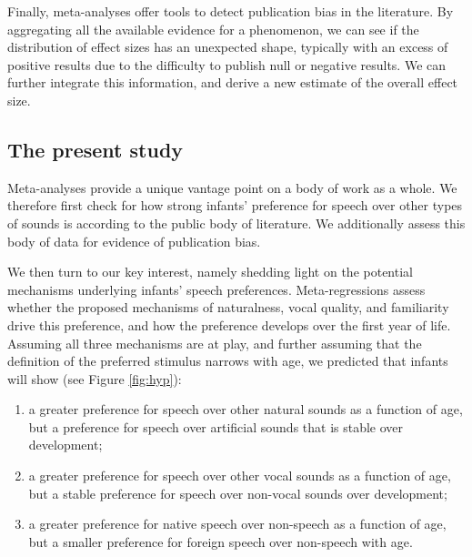 \documentclass[
  english,
  man]{apa6}
\providecommand{\tightlist}{%
  \setlength{\itemsep}{0pt}\setlength{\parskip}{0pt}}
\begin{document}
Finally, meta-analyses offer tools to detect publication bias in the literature. By aggregating all the available evidence for a phenomenon, we can see if the distribution of effect sizes has an unexpected shape, typically with an excess of positive results due to the difficulty to publish null or negative results. We can further integrate this information, and derive a new estimate of the overall effect size.

\hypertarget{the-present-study}{%
\subsection{The present study}\label{the-present-study}}

Meta-analyses provide a unique vantage point on a body of work as a whole. We therefore first check for how strong infants' preference for speech over other types of sounds is according to the public body of literature. We additionally assess this body of data for evidence of publication bias.

We then turn to our key interest, namely shedding light on the potential mechanisms underlying infants' speech preferences. Meta-regressions assess whether the proposed mechanisms of naturalness, vocal quality, and familiarity drive this preference, and how the preference develops over the first year of life. Assuming all three mechanisms are at play, and further assuming that the definition of the preferred stimulus narrows with age, we predicted that infants will show (see Figure \ref{fig:hyp}):

\begin{enumerate}
\def\labelenumi{\arabic{enumi}.}
\tightlist
\item
  a greater preference for speech over other natural sounds as a function of age, but a preference for speech over artificial sounds that is stable over development;
\item
  a greater preference for speech over other vocal sounds as a function of age, but a stable preference for speech over non-vocal sounds over development;
\item
  a greater preference for native speech over non-speech as a function of age, but a smaller preference for foreign speech over non-speech with age.
\end{enumerate}
\end{document}
